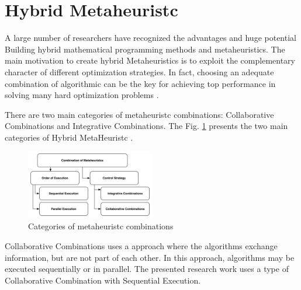 \section{Hybrid Metaheuristc}


A large  number of researchers have recognized the advantages and huge potential Building
hybrid mathematical programming methods and metaheuristics.
The main motivation to create hybrid Metaheuristics is to exploit the complementary character of different optimization strategies. In fact, choosing an adequate combination of algorithmic can be the key for achieving top performance in solving many hard optimization problems \cite{Puchinger2005} \cite{Blum2012}.


There are two main categories of metaheuristc combinations: Collaborative Combinations and Integrative Combinations. The Fig. \ref{fig:metaheuristc} presents the two main categories of Hybrid MetaHeuristc \cite{Puchinger2005}.

\begin{figure}[h]
\includegraphics[width=0.5\textwidth]{./images/metaheuristc2.png}
\caption{Categories of metaheuristc combinations \cite{Puchinger2005} }
\label{fig:metaheuristc}
\end{figure}

Collaborative Combinations uses a approach where the  algorithms exchange information, but are not part of each other. In this approach,  algorithms may be executed sequentially or in parallel. The presented research work uses a type of  Collaborative Combination with Sequential Execution.

